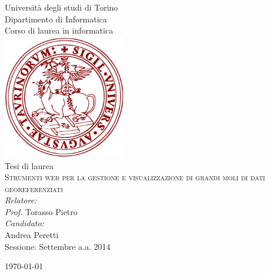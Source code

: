 \begin{titlepage}
\begin{center}

{\LARGE Università degli studi di Torino}\\
{Dipartimento di Informatica}\\[1cm]

{\Large Corso di laurea in informatica}\\[0.5cm]
\includegraphics[width=0.40\textwidth]{img/unitologo.png}~\\[0.5cm]

{Tesi di laurea}\\[1cm]
\textsc{\LARGE Strumenti web per la gestione e visualizzazione di grandi moli di dati georeferenziati}\\[1.5cm]


{\emph{Relatore:}}\\
{\emph{Prof.} Torasso Pietro}\\[1cm]

{\emph{Candidato:}}\\
{Andrea Peretti}\\[1.5cm]
{\Large Sessione:}
{Settembre a.a. 2014}




\vfill

{\large \today}

\end{center}
\end{titlepage}
